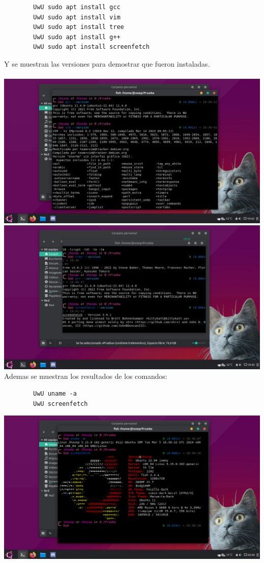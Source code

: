 \documentclass{article}
\begin{document}
    \begin{verbatim}
        UwU sudo apt install gcc
        UwU sudo apt install vim
        UwU sudo apt install tree
        UwU sudo apt install g++
        UwU sudo apt install screenfetch
    \end{verbatim}
    
    Y se muestran las versiones para demostrar que fueron instaladas.
    \\
    \\ 

    \includegraphics[scale=0.35]{Uwuntu/Versiones1.png}
    \includegraphics[scale=0.35]{Uwuntu/Versiones2.png}
Ademas se muestran los resultados de los comandos:
\\
    \begin{verbatim}
        UwU uname -a
        UwU screenfetch
    \end{verbatim}
    
    \includegraphics[scale=0.45]{Uwuntu/Comandos.png}
    \newpage
\end{document}
